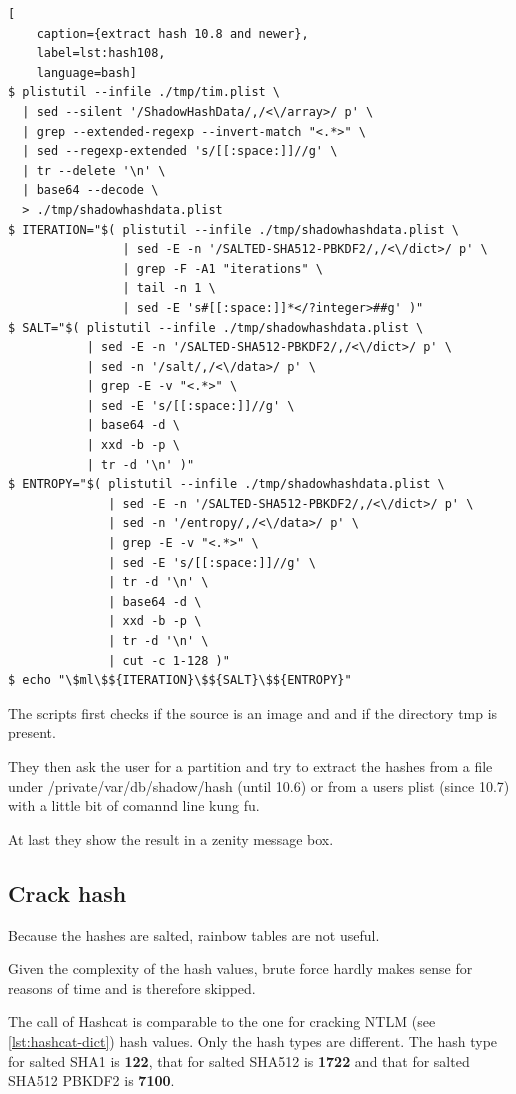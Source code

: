 \begin{lstlisting}[
    caption={extract hash 10.8 and newer},
    label=lst:hash108,
    language=bash]
$ plistutil --infile ./tmp/tim.plist \
  | sed --silent '/ShadowHashData/,/<\/array>/ p' \
  | grep --extended-regexp --invert-match "<.*>" \
  | sed --regexp-extended 's/[[:space:]]//g' \
  | tr --delete '\n' \
  | base64 --decode \
  > ./tmp/shadowhashdata.plist
$ ITERATION="$( plistutil --infile ./tmp/shadowhashdata.plist \
                | sed -E -n '/SALTED-SHA512-PBKDF2/,/<\/dict>/ p' \
                | grep -F -A1 "iterations" \
                | tail -n 1 \
                | sed -E 's#[[:space:]]*</?integer>##g' )"
$ SALT="$( plistutil --infile ./tmp/shadowhashdata.plist \
           | sed -E -n '/SALTED-SHA512-PBKDF2/,/<\/dict>/ p' \
           | sed -n '/salt/,/<\/data>/ p' \
           | grep -E -v "<.*>" \
           | sed -E 's/[[:space:]]//g' \
           | base64 -d \
           | xxd -b -p \
           | tr -d '\n' )"
$ ENTROPY="$( plistutil --infile ./tmp/shadowhashdata.plist \
              | sed -E -n '/SALTED-SHA512-PBKDF2/,/<\/dict>/ p' \
              | sed -n '/entropy/,/<\/data>/ p' \
              | grep -E -v "<.*>" \
              | sed -E 's/[[:space:]]//g' \
              | tr -d '\n' \
              | base64 -d \
              | xxd -b -p \
              | tr -d '\n' \
              | cut -c 1-128 )"
$ echo "\$ml\$${ITERATION}\$${SALT}\$${ENTROPY}"
\end{lstlisting}

\noindent The scripts first checks if the source is an image and and if the directory tmp is present.

They then ask the user for a partition and try to extract the hashes from a file under /private/var/db/shadow/hash (until 10.6) or from a users plist (since 10.7) with a little bit of comannd line kung fu.

At last they show the result in a zenity message box.

\subsection{Crack hash}

Because the hashes are salted, rainbow tables are not useful.

Given the complexity of the hash values, brute force hardly makes sense for reasons of time and is therefore skipped.

The call of Hashcat is comparable to the one for cracking NTLM (see \cref{lst:hashcat-dict}) hash values. Only the hash types are different. The hash type for salted SHA1 is \textbf{122}, that for salted SHA512 is \textbf{1722} and that for salted SHA512 PBKDF2 is \textbf{7100}.

